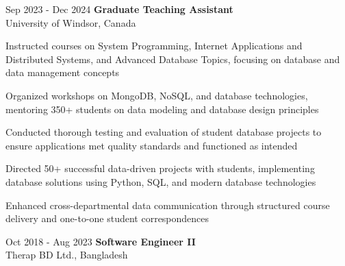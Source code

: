     \begin{twocolentry}{
        Sep 2023 - Dec 2024
    }
        \textbf{Graduate Teaching Assistant} \\ University of Windsor, Canada\end{twocolentry}

    \vspace{0.10 cm}
    \begin{onecolentry}
        \begin{highlights}
            \item Instructed courses on System Programming, Internet Applications and Distributed Systems, and Advanced Database Topics, focusing on database and data management concepts
            \item Organized workshops on MongoDB, NoSQL, and database technologies, mentoring 350+ students on data modeling and database design principles
            \item Conducted thorough testing and evaluation of student database projects to ensure applications met quality standards and functioned as intended
            \item Directed 50+ successful data-driven projects with students, implementing database solutions using Python, SQL, and modern database technologies
            \item Enhanced cross-departmental data communication through structured course delivery and one-to-one student correspondences
        \end{highlights}
    \end{onecolentry}
\vspace{0.2 cm}
    \begin{twocolentry}{
        Oct 2018 - Aug 2023
    }
        \textbf{Software Engineer II} \\ Therap BD Ltd., Bangladesh\end{twocolentry}

